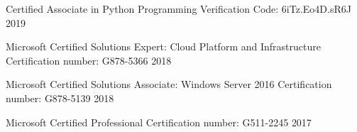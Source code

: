 



\begin{cvcertifications}
	
	\cvcertification
	{Certified Associate in Python Programming} %
	{Verification Code: 6iTz.Eo4D.sR6J} %
	{2019} %
	

\end{cvcertifications}




\begin{cvcertifications}

	\cvcertification
		{Microsoft Certified Solutions Expert: Cloud Platform and Infrastructure} %
		{Certification number: G878-5366} %
		{2018} %
		
	\cvcertification
		{Microsoft Certified Solutions Associate: Windows Server 2016} %
		{Certification number: G878-5139} %
		{2018} %

	\cvcertification
		{Microsoft Certified Professional} %
		{Certification number: G511-2245} %
		{2017} %
\end{cvcertifications}


